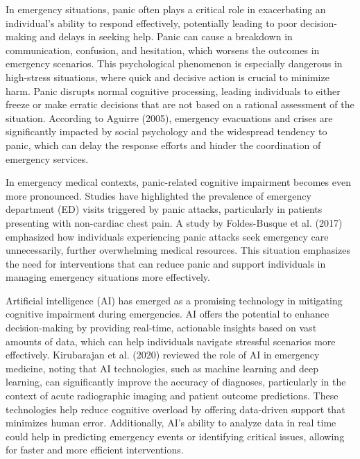 
In emergency situations, panic often plays a critical role in exacerbating an individual's ability to respond effectively, potentially leading to poor decision-making and delays in seeking help. Panic can cause a breakdown in communication, confusion, and hesitation, which worsens the outcomes in emergency scenarios. This psychological phenomenon is especially dangerous in high-stress situations, where quick and decisive action is crucial to minimize harm. Panic disrupts normal cognitive processing, leading individuals to either freeze or make erratic decisions that are not based on a rational assessment of the situation. According to Aguirre (2005), emergency evacuations and crises are significantly impacted by social psychology and the widespread tendency to panic, which can delay the response efforts and hinder the coordination of emergency services.

In emergency medical contexts, panic-related cognitive impairment becomes even more pronounced. Studies have highlighted the prevalence of emergency department (ED) visits triggered by panic attacks, particularly in patients presenting with non-cardiac chest pain. A study by Foldes-Busque et al. (2017) emphasized how individuals experiencing panic attacks seek emergency care unnecessarily, further overwhelming medical resources. This situation emphasizes the need for interventions that can reduce panic and support individuals in managing emergency situations more effectively.

Artificial intelligence (AI) has emerged as a promising technology in mitigating cognitive impairment during emergencies. AI offers the potential to enhance decision-making by providing real-time, actionable insights based on vast amounts of data, which can help individuals navigate stressful scenarios more effectively. Kirubarajan et al. (2020) reviewed the role of AI in emergency medicine, noting that AI technologies, such as machine learning and deep learning, can significantly improve the accuracy of diagnoses, particularly in the context of acute radiographic imaging and patient outcome predictions. These technologies help reduce cognitive overload by offering data-driven support that minimizes human error. Additionally, AI's ability to analyze data in real time could help in predicting emergency events or identifying critical issues, allowing for faster and more efficient interventions.

